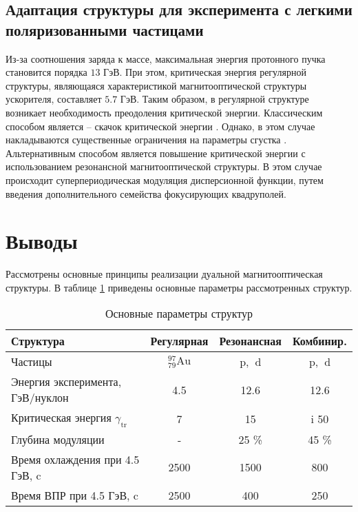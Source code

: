 \subsection{Адаптация структуры для эксперимента с легкими поляризованными частицами}\label{sec:ch:ions_light/transition/energy}

\par Из-за соотношения заряда к массе, максимальная энергия протонного пучка становится порядка $13$ ГэВ. При этом, критическая энергия регулярной структуры, являющаяся характеристикой магнитооптической структуры ускорителя, составляет $5.7$ ГэВ. Таким образом, в регулярной структуре возникает необходимость преодоления критической энергии. Классическим способом является – скачок критической энергии \cite{Kolokolchikov:2024_bb_rupac}. Однако, в этом случае накладываются существенные ограничения на параметры сгустка \cite{Kolokolchikov:2024_bb_dspin}. Альтернативным способом является повышение критической энергии с использованием резонансной магнитооптической структуры. В этом случае происходит суперпериодическая модуляция дисперсионной функции, путем введения дополнительного семейства фокусирующих квадруполей.

\section*{Выводы}
\par Рассмотрены основные принципы реализации дуальной магнитооптическая структуры. 
В таблице \ref{tab:dual} приведены основные параметры рассмотренных структур.

\begin{table}
\begin{center}
\begin{tabular}{|l|c|c|c|} 
\hline
Структура & Регулярная & Резонансная & Комбинир. \\
\hline Частицы & ${ }_{79}^{97} \mathrm{Au}$ & $\mathrm{p}$, $\mathrm{~d}$ & $\mathrm{p}$, $\mathrm{~d}$ \\
\hline Энергия эксперимента, ГэВ/нуклон & 4.5 & 12.6 & 12.6 \\
\hline Критическая энергия $\gamma_{\mathrm{tr}}$  & 7 & 15 & i 50 \\
\hline Глубина модуляции & - & 25 \% & 45 \% \\
\hline Время охлаждения при 4.5 ГэВ, c & 2500 & 1500 & 800 \\
\hline Время ВПР при 4.5 ГэВ, c & 2500 & 400 & 250 \\
\hline
\end{tabular}
\end{center}
\caption{Основные параметры структур}
\label{tab:dual}
\end{table}

